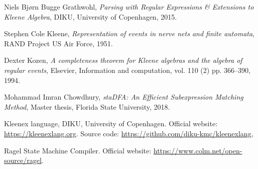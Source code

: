 \documentclass[]{article}
\begin{document}
\begin{thebibliography}{99}
    Niels Bj{\o}rn Bugge Grathwohl,
    \textit{Parsing with Regular Expressions \& Extensions to Kleene Algebra},
    DIKU, University of Copenhagen,
    2015.

    Stephen Cole Kleene,
    \textit{Representation of events in nerve nets and finite automata},
    RAND Project US Air Force,
    1951.

    Dexter Kozen,
    \textit{A completeness theorem for {Kleene} algebras and the algebra of regular events},
    Elsevier,
    Information and computation,
    vol. 110 (2)
    pp. 366--390,
    1994.

    Mohammad Imran Chowdhury,
    \textit{staDFA: An Efficient Subexpression Matching Method},
    Master thesis,
    Florida State University,
    2018.

    Kleenex language,
    DIKU, University of Copenhagen.
    Official website: \url{https://kleenexlang.org}.
    Source code: \url{https://github.com/diku-kmc/kleenexlang},

    Ragel State Machine Compiler.
    Official website: \url{https://www.colm.net/open-source/ragel}.

\end{thebibliography}
\end{document}

